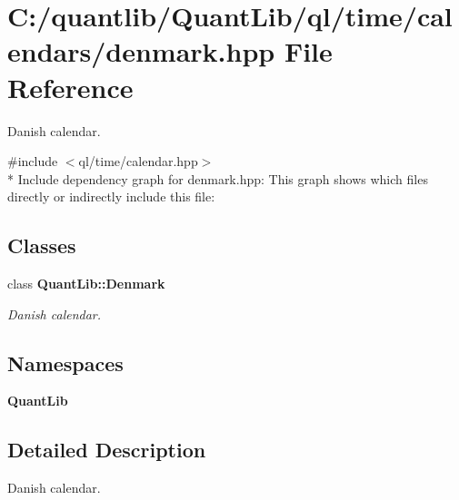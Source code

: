 \section{C\+:/quantlib/\+Quant\+Lib/ql/time/calendars/denmark.hpp File Reference}
\label{denmark_8hpp}


Danish calendar.  


{\ttfamily \#include $<$ql/time/calendar.\+hpp$>$}\\*
Include dependency graph for denmark.\+hpp\+:
This graph shows which files directly or indirectly include this file\+:
\subsection*{Classes}
\begin{DoxyCompactItemize}
\item 
class {\bf Quant\+Lib\+::\+Denmark}
\begin{DoxyCompactList}\small\item\em Danish calendar. \end{DoxyCompactList}\end{DoxyCompactItemize}
\subsection*{Namespaces}
\begin{DoxyCompactItemize}
\item 
 {\bf Quant\+Lib}
\end{DoxyCompactItemize}


\subsection{Detailed Description}
Danish calendar. 

